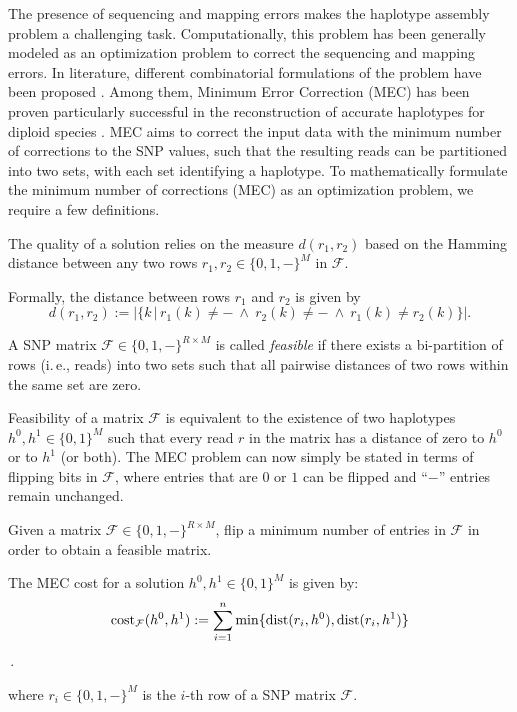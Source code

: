 The presence of sequencing and mapping errors makes the haplotype assembly problem a challenging task. 
Computationally, this problem has been generally modeled as an optimization problem to correct the sequencing and mapping errors.
In literature, different combinatorial formulations of the problem have been
proposed \citep{lippert2002algorithmic}. Among them, Minimum Error Correction (MEC) \citep{lippert2002algorithmic} has
been proven particularly successful in the reconstruction of accurate haplotypes for
diploid species \citep{martin2016whatshap, he2010optimal, CDW13_exact, Glusman2014}. MEC aims to correct the input data with the minimum
number of corrections to the SNP values, such that the resulting reads can be partitioned into two sets, with each set identifying a haplotype. 
To mathematically formulate the minimum number of corrections (MEC) as an optimization problem, we require a few definitions.

The quality of a solution relies on the measure $d(r_1,r_2)$ based on the Hamming distance between any two rows $r_1,r_2\in\{0,1, -\}^M$ in $\mathcal{F}$.
\begin{definition}[Distance] 
 Formally, the distance between rows $r_1$ and $r_2$ is given by
\[d(r_1,r_2):= \big|\big\{k\,\big|\,r_1(k)\neq -\ \wedge\ r_2(k)\neq -\ \wedge\ r_1(k)\neq r_2(k)\big\}\big|.\]
\label{eq:distance}
\end{definition}

\begin{definition}[Feasibility]
A SNP matrix $\mathcal{F}\in\{0,1,-\}^{R\times M}$ is called \emph{feasible} if there exists a bi-partition of rows (i.\,e., reads) into two sets such that all pairwise distances of two rows within the same set are zero.
\label{def:feasible-mec}
\end{definition}
Feasibility of a matrix $\mathcal{F}$ is equivalent to the existence of two haplotypes $h^0,h^1\in\{0,1\}^M$ such that every read $r$ in the matrix has a distance of zero to $h^0$ or to $h^1$ (or both).
The MEC problem can now simply be stated in terms of flipping bits in $\mathcal{F}$, where entries that are $0$ or $1$ can be flipped and ``$-$'' entries remain unchanged.

\begin{problem}[MEC]
Given a matrix $\mathcal{F}\in\{0,1,-\}^{R\times M}$, flip a minimum number of entries in $\mathcal{F}$ in order to obtain a feasible matrix.
\label{prob:mec}
\end{problem}


\begin{definition}
The MEC cost for a solution $h^0,h^1\in\{0,1\}^M$ is given by: \\
    \[\mathrm{cost}_{\mathcal{F}}(h^0,h^1) := \sum_{i=1}^{n} \min\{\mathrm{dist}(r_i,h^0), \mathrm{dist}(r_i,h^1)\}\]\,.

where $r_i \in \{0,1, -\}^M$ is the $i$-th row of a SNP matrix $\mathcal{F}$.
\label{eq:cost}
\end{definition}

